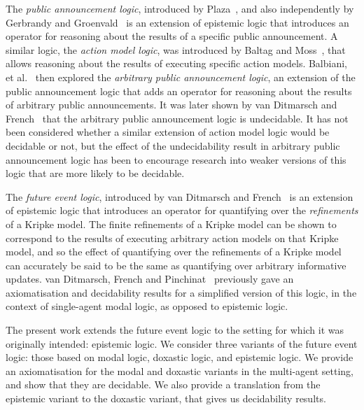 The {\em public announcement logic}, introduced by
Plaza~\cite{plaza2007logics}, and also independently by Gerbrandy and
Groenvald~\cite{gerbrandy1997reasoning} is an extension of epistemic logic that
introduces an operator for reasoning about the results of a specific public
announcement. A similar logic, the {\em action model logic}, was introduced by
Baltag and Moss~\cite{baltag2004logics}, that allows reasoning about the
results of executing specific action models. Balbiani, et
al.~\cite{balbiani2007arbitrary} then explored the {\em arbitrary public
announcement logic}, an extension of the public announcement logic that adds
an operator for reasoning about the results of arbitrary public announcements.
It was later shown by van Ditmarsch and French~\cite{french2008undecidability}
that the arbitrary public announcement logic is undecidable. It has not been
considered whether a similar extension of action model logic would be decidable
or not, but the effect of the undecidability result in arbitrary public
announcement logic has been to encourage research into weaker versions of this
logic that are more likely to be decidable.

The {\em future event logic}, introduced by van Ditmarsch and
French~\cite{french2009simulation} is an extension of epistemic logic that
introduces an operator for quantifying over the {\em refinements} of a Kripke
model. The finite refinements of a Kripke model can be shown to correspond to
the results of executing arbitrary action models on that Kripke model, and so
the effect of quantifying over the refinements of a Kripke model can accurately
be said to be the same as quantifying over arbitrary informative updates. van
Ditmarsch, French and Pinchinat~\cite{french2010future} previously gave an
axiomatisation and decidability results for a simplified version of this logic,
in the context of single-agent modal logic, as opposed to epistemic logic.

The present work extends the future event logic to the setting for which it was
originally intended: epistemic logic. We consider three variants of the future
event logic: those based on modal logic, doxastic logic, and epistemic logic. We
provide an axiomatisation for the modal and doxastic variants in the
multi-agent setting, and show that they are decidable. We also provide a
translation from the epistemic variant to the doxastic variant, that gives us
decidability results.
